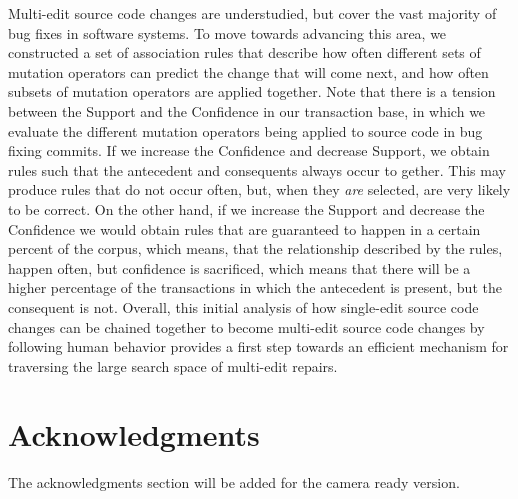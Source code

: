 \documentclass[conference]{IEEEtran}
\begin{document}
Multi-edit source code changes are understudied, but cover
the vast majority of bug fixes in software systems. 
To move towards advancing this area, we constructed a set of association rules that describe 
how often different sets of mutation operators can predict the change that will 
come next, and how often subsets of mutation operators are applied together.
Note that there is a tension between the Support and the Confidence in our transaction 
base, in which we 
evaluate the different mutation operators being applied to source code in bug 
fixing commits. 
If we increase the Confidence and decrease Support, we obtain rules such that
the antecedent and consequents always occur to gether.  This may produce rules that
do not occur often, but, when they \emph{are} selected, are very likely to be
correct. On the other hand, if 
we increase the Support and decrease the Confidence we would obtain rules that 
are guaranteed to happen in a certain percent of the corpus, which means, that 
the relationship described by the rules, happen often, but confidence is 
sacrificed, which means that there will be a higher percentage of the 
transactions in which the antecedent is present, but the consequent is not. 
Overall, this initial analysis of how single-edit source code changes can be chained together 
to become multi-edit source code changes by following human behavior provides a
first step towards an efficient mechanism for traversing the large search space
of multi-edit repairs.





\section*{Acknowledgments}
The acknowledgments section will be added for the camera ready version. 







%
%
%







\end{document}
